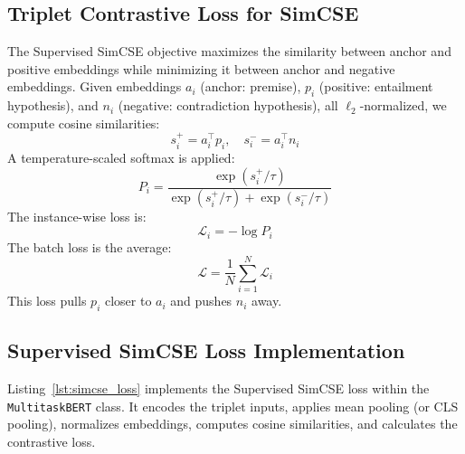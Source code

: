 \subsection{Triplet Contrastive Loss for SimCSE}
The Supervised SimCSE objective maximizes the similarity between anchor and positive embeddings while minimizing it between anchor and negative embeddings. Given embeddings $a_i$ (anchor: premise), $p_i$ (positive: entailment hypothesis), and $n_i$ (negative: contradiction hypothesis), all $\ell_2$-normalized, we compute cosine similarities:
\[
s^+_i = a_i^\top p_i, \quad s^-_i = a_i^\top n_i
\]
A temperature-scaled softmax is applied:
\[
P_i = \frac{\exp(s^+_i / \tau)}{\exp(s^+_i / \tau) + \exp(s^-_i / \tau)}
\]
The instance-wise loss is:
\[
\mathcal{L}_i = -\log P_i
\]
The batch loss is the average:
\[
\mathcal{L} = \frac{1}{N} \sum_{i=1}^N \mathcal{L}_i
\]
This loss pulls $p_i$ closer to $a_i$ and pushes $n_i$ away.

\subsection{Supervised SimCSE Loss Implementation}
Listing~\ref{lst:simcse_loss} implements the Supervised SimCSE loss within the \texttt{MultitaskBERT} class. It encodes the triplet inputs, applies mean pooling (or CLS pooling), normalizes embeddings, computes cosine similarities, and calculates the contrastive loss.

